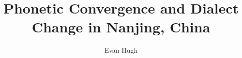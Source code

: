 \documentclass[defaultstyle,11pt]{thesis}
\title{Phonetic Convergence and Dialect Change in Nanjing, China}
\author{Evan Hugh}{Coles-Harris}
\begin{document}










\nocite{*}		%

\appendix


\end{document}
